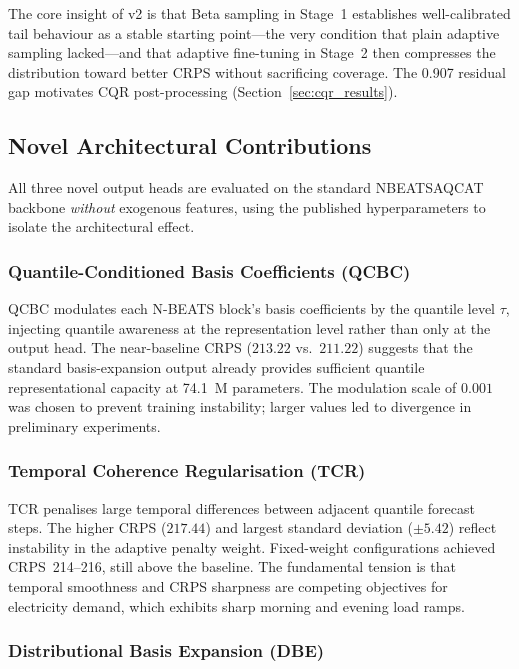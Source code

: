 The core insight of v2 is that Beta sampling in Stage~1 establishes
well-calibrated tail behaviour as a stable starting point---the very
condition that plain adaptive sampling lacked---and that adaptive
fine-tuning in Stage~2 then compresses the distribution toward better
CRPS without sacrificing coverage.
The 0.907 residual gap motivates CQR post-processing
(Section~\ref{sec:cqr_results}).

\subsection{Novel Architectural Contributions}
\label{subsec:novel_results}

All three novel output heads are evaluated on the standard NBEATSAQCAT
backbone \emph{without} exogenous features, using the published
hyperparameters to isolate the architectural effect.

\subsubsection{Quantile-Conditioned Basis Coefficients (QCBC)}

QCBC modulates each N-BEATS block's basis coefficients by the quantile
level $\tau$, injecting quantile awareness at the representation level
rather than only at the output head.
The near-baseline CRPS ($213.22$ vs.\ $211.22$) suggests that the standard
basis-expansion output already provides sufficient quantile representational
capacity at 74.1~M parameters.
The modulation scale of $0.001$ was chosen to prevent training instability;
larger values led to divergence in preliminary experiments.

\subsubsection{Temporal Coherence Regularisation (TCR)}

TCR penalises large temporal differences between adjacent quantile forecast
steps.  The higher CRPS ($217.44$) and largest standard deviation ($\pm5.42$)
reflect instability in the adaptive penalty weight.
Fixed-weight configurations achieved CRPS~214--216, still above the
baseline.  The fundamental tension is that temporal smoothness and CRPS
sharpness are competing objectives for electricity demand, which exhibits
sharp morning and evening load ramps.

\subsubsection{Distributional Basis Expansion (DBE)}

